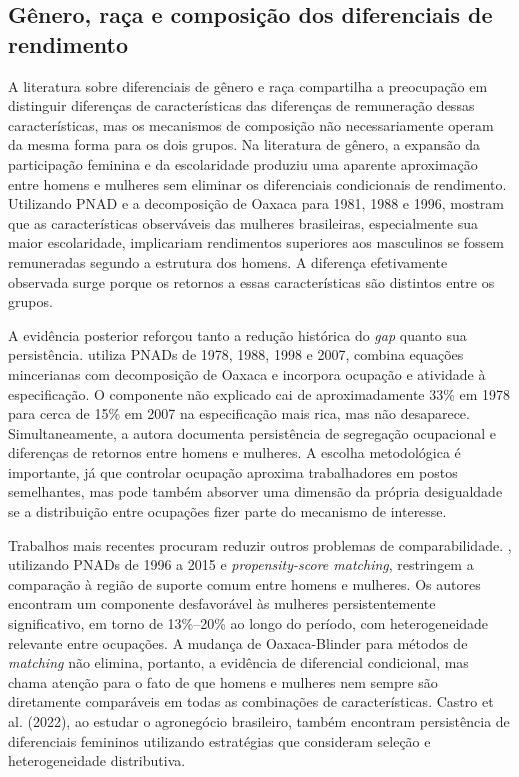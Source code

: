 \documentclass[12pt]{article}
\begin{document}
\subsection{Gênero, raça e composição dos diferenciais de rendimento}

A literatura sobre diferenciais de gênero e raça compartilha a preocupação em distinguir 
diferenças de características das diferenças de remuneração dessas características, mas os 
mecanismos de composição não necessariamente operam da mesma forma para os dois grupos. Na 
literatura de gênero, a expansão da participação feminina e da escolaridade produziu uma 
aparente aproximação entre homens e mulheres sem eliminar os diferenciais condicionais de 
rendimento. Utilizando PNAD e a decomposição de Oaxaca para 1981, 1988 e 1996, 
\citet{giuberti2005} mostram que as características observáveis das mulheres brasileiras, 
especialmente sua maior escolaridade, implicariam rendimentos superiores aos masculinos se 
fossem remuneradas segundo a estrutura dos homens. A diferença efetivamente observada 
surge porque os retornos a essas características são distintos entre os grupos.

A evidência posterior reforçou tanto a redução histórica do \textit{gap} quanto sua persistência. 
\citet{madalozzo2010} utiliza PNADs de 1978, 1988, 1998 e 2007, combina equações mincerianas 
com decomposição de Oaxaca e incorpora ocupação e atividade à especificação. O componente 
não explicado cai de aproximadamente 33\% em 1978 para cerca de 15\% em 2007 na especificação 
mais rica, mas não desaparece. Simultaneamente, a autora documenta persistência de segregação 
ocupacional e diferenças de retornos entre homens e mulheres. A escolha metodológica é 
importante, já que controlar ocupação aproxima trabalhadores em postos semelhantes, mas pode também 
absorver uma dimensão da própria desigualdade se a distribuição entre ocupações fizer parte 
do mecanismo de interesse.

Trabalhos mais recentes procuram reduzir outros problemas de comparabilidade. 
\citet{morello2021}, utilizando PNADs de 1996 a 2015 e \textit{propensity-score matching},
restringem a comparação à região de suporte comum entre homens e mulheres. Os autores 
encontram um componente desfavorável às mulheres persistentemente significativo, em torno 
de 13\%–20\% ao longo do período, com heterogeneidade relevante entre ocupações. A mudança 
de Oaxaca-Blinder para métodos de \textit{matching} não elimina, portanto, a evidência de diferencial
condicional, mas chama atenção para o fato de que homens e mulheres nem sempre são diretamente 
comparáveis em todas as combinações de características. Castro et al. (2022), ao estudar o 
agronegócio brasileiro, também encontram persistência de diferenciais femininos utilizando 
estratégias que consideram seleção e heterogeneidade distributiva.
\end{document}
